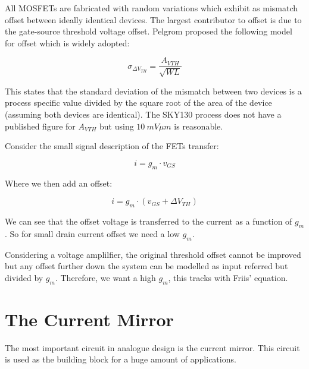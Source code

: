 \documentclass[11pt]{article}
\begin{document}
All MOSFETs are fabricated with random variations which exhibit as mismatch offset between ideally identical devices. The largest contributor to offset is due to the gate-source threshold voltage offset. Pelgrom proposed the following model for offset which is widely adopted:

\begin{equation}
\sigma_{\Delta V_{TH}} = \frac{A_{VTH}}{\sqrt{WL}}
\end{equation}

This states that the standard deviation of the mismatch between two devices is a process specific value divided by the square root of the area of the device (assuming both devices are identical). The SKY130 process does not have a published figure for $A_{VTH}$ but using $10 \ mV \mu m$ is reasonable.

Consider the small signal description of the FETs transfer:

\begin{equation}
i = g_m \cdot v_{GS}
\end{equation}

Where we then add an offset:

\begin{equation}
i = g_m \cdot ( v_{GS} + \Delta V_{TH} )
\end{equation}

We can see that the offset voltage is transferred to the current as a function of $g_m$. So for small drain current offset we need a low $g_m$.

Considering a voltage amplilfier, the original threshold offset cannot be improved but any offset further down the system can be modelled as input referred but divided by $g_m$. Therefore, we want a high $g_m$, this tracks with Friis' equation.


\newpage
\section{The Current Mirror}

The most important circuit in analogue design is the current mirror. This circuit is used as the building block for a huge amount of applications.

\begin{figure}[h]
\end{figure}
\end{document}
